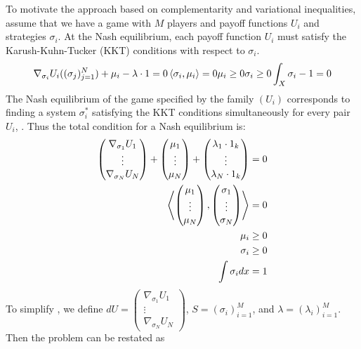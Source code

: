 To motivate the approach based on complementarity and variational inequalities, assume that we have a game with $M$ players and payoff functions $U_i$ and strategies $\sigma_i$. At the Nash equilibrium, each payoff function $U_i$ must satisfy the Karush-Kuhn-Tucker (KKT) conditions with respect to $\sigma_i$.
\begin{align}
  \nabla_{\sigma_i}U_i((\sigma_j)_{j=1}^N) + \mu_i - \lambda \cdot 1 = 0
  \left \langle \sigma_i,\mu_i \right \rangle = 0
  \mu_i \geq 0
  \sigma_i \geq 0
  \int_X \sigma_i - 1 = 0
\end{align}
The Nash equilibrium of the game specified by the family $(U_i)$ corresponds to finding a system $\sigma_i^*$ satisfying the KKT conditions simultaneously for every pair $U_i$, \citep{deimling2010nonlinear}. Thus the total condition for a Nash equilibrium is:
\begin{equation}
  \begin{split}
  \begin{pmatrix}
    \nabla_{\sigma_1} U_1 \\
    \vdots \\
    \nabla_{\sigma_N} U_N
\end{pmatrix} + \begin{pmatrix}
    \mu_1 \\
    \vdots \\
    \mu_N
\end{pmatrix} + \begin{pmatrix}
    \lambda_1 \cdot 1_k \\
    \vdots \\
    \lambda_N \cdot 1_k
\end{pmatrix} = 0 \\
\left \langle 
\begin{pmatrix}
  \mu_1 \\
  \vdots \\
  \mu_N
\end{pmatrix}, \begin{pmatrix}
  \sigma_1 \\
  \vdots \\
  \sigma_N
\end{pmatrix} \right \rangle = 0 \\
\mu_i \geq 0 \\
  \sigma_i \geq 0 \\
    \int \sigma_i dx = 1
    \label{eq:KKT_total}
  \end{split}
\end{equation}
To simplify , we define $dU = \begin{pmatrix} \nabla_{\sigma_1} U_1 \\
    \vdots \\
    \nabla_{\sigma_N} U_N \end{pmatrix}$, $S=(\sigma_i)_{i=1}^M$, and $\lambda = (\lambda_i)_{i=1}^M$. Then the problem can be restated as
